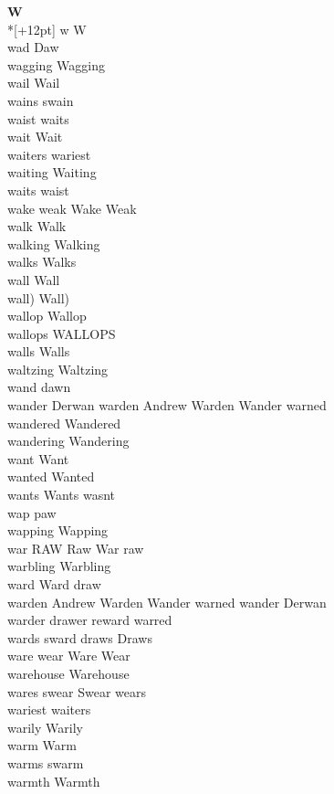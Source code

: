 \vspace{14pt}
\noindent\textbf{\Large W}\\*[+12pt]
w W\\
wad Daw\\
wagging Wagging\\
wail Wail\\
wains swain\\
waist waits\\
wait Wait\\
waiters wariest\\
waiting Waiting\\
waits waist\\
wake weak Wake Weak\\
walk Walk\\
walking Walking\\
walks Walks\\
wall Wall\\
wall) Wall)\\
wallop Wallop\\
wallops WALLOPS\\
walls Walls\\
waltzing Waltzing\\
wand dawn\\
wander Derwan warden Andrew Warden Wander warned\\
wandered Wandered\\
wandering Wandering\\
want Want\\
wanted Wanted\\
wants Wants wasnt\\
wap paw\\
wapping Wapping\\
war RAW Raw War raw\\
warbling Warbling\\
ward Ward draw\\
warden Andrew Warden Wander warned wander Derwan\\
warder drawer reward warred\\
wards sward draws Draws\\
ware wear Ware Wear\\
warehouse Warehouse\\
wares swear Swear wears\\
wariest waiters\\
warily Warily\\
warm Warm\\
warms swarm\\
warmth Warmth\\
